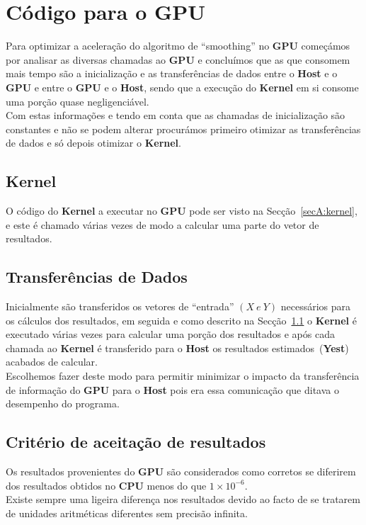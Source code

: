 \chapter{Código para o GPU}
Para optimizar a aceleração do algoritmo de ``smoothing'' no \textbf{GPU} começámos por analisar as diversas chamadas ao \textbf{GPU} e concluímos que as que consomem mais tempo são a inicialização e as transferências de dados entre o \textbf{Host} e o \textbf{GPU} e entre o \textbf{GPU} e o \textbf{Host}, sendo que a execução do \textbf{Kernel} em si consome uma porção quase negligenciável.\\

Com estas informações e tendo em conta que as chamadas de inicialização são constantes e não se podem alterar procurámos primeiro otimizar as transferências de dados e só depois otimizar o \textbf{Kernel}.

\section{Kernel}
\label{sec:kernel}
O código do \textbf{Kernel} a executar no \textbf{GPU} pode ser visto na Secção~\ref{secA:kernel}, e este é chamado várias vezes de modo a calcular uma parte do vetor de resultados.

\section{Transferências de Dados}
Inicialmente são transferidos os vetores de ``entrada'' \mbox{$(X\ e\ Y)$} necessários para os cálculos dos resultados, em seguida e como descrito na Secção~\ref{sec:kernel} o \textbf{Kernel} é executado várias vezes para calcular uma porção dos resultados e após cada chamada ao \textbf{Kernel} é transferido para o \textbf{Host} os resultados estimados~(\textbf{Yest}) acabados de calcular.\\

Escolhemos fazer deste modo para permitir minimizar o impacto da transferência de informação do \textbf{GPU} para o \textbf{Host} pois era essa comunicação que ditava o desempenho do programa.

\section{Critério de aceitação de resultados}
Os resultados provenientes do \textbf{GPU} são considerados como corretos se diferirem dos resultados obtidos no \textbf{CPU} menos do que \mbox{$1\times10^{-6}$}.\\

Existe sempre uma ligeira diferença nos resultados devido ao facto de se tratarem de unidades aritméticas diferentes sem precisão infinita.